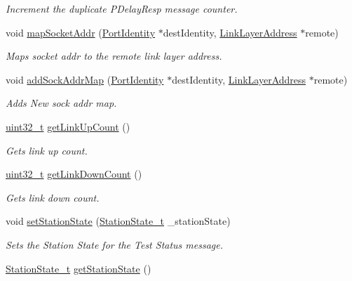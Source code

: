 \begin{DoxyCompactItemize}
\begin{DoxyCompactList}\small\item\em Increment the duplicate P\+Delay\+Resp message counter. \end{DoxyCompactList}\item 
void \hyperlink{class_ether_port_a28bc191b6b7941be6ce7ac75a10f73de}{map\+Socket\+Addr} (\hyperlink{class_port_identity}{Port\+Identity} $\ast$dest\+Identity, \hyperlink{class_link_layer_address}{Link\+Layer\+Address} $\ast$remote)
\begin{DoxyCompactList}\small\item\em Maps socket addr to the remote link layer address. \end{DoxyCompactList}\item 
void \hyperlink{class_ether_port_abcd8e41ae423bd02824183b2e97b73f0}{add\+Sock\+Addr\+Map} (\hyperlink{class_port_identity}{Port\+Identity} $\ast$dest\+Identity, \hyperlink{class_link_layer_address}{Link\+Layer\+Address} $\ast$remote)
\begin{DoxyCompactList}\small\item\em Adds New sock addr map. \end{DoxyCompactList}\item 
\hyperlink{parse_8c_a6eb1e68cc391dd753bc8ce896dbb8315}{uint32\+\_\+t} \hyperlink{class_ether_port_a0a5fca61b7009f358124a07b04d77534}{get\+Link\+Up\+Count} ()
\begin{DoxyCompactList}\small\item\em Gets link up count. \end{DoxyCompactList}\item 
\hyperlink{parse_8c_a6eb1e68cc391dd753bc8ce896dbb8315}{uint32\+\_\+t} \hyperlink{class_ether_port_a2b17baca9933f02f9e3bd25983395d97}{get\+Link\+Down\+Count} ()
\begin{DoxyCompactList}\small\item\em Gets link down count. \end{DoxyCompactList}\item 
void \hyperlink{class_ether_port_ae2e3886b6c2390abad4892141f3114e2}{set\+Station\+State} (\hyperlink{avbap__message_8hpp_a0ea424c21354a92be352893d8feeea22}{Station\+State\+\_\+t} \+\_\+station\+State)
\begin{DoxyCompactList}\small\item\em Sets the Station State for the Test Status message. \end{DoxyCompactList}\item 
\hyperlink{avbap__message_8hpp_a0ea424c21354a92be352893d8feeea22}{Station\+State\+\_\+t} \hyperlink{class_ether_port_ace2ea6ac1044661ce0c3b2fe41c17b67}{get\+Station\+State} ()

\end{DoxyCompactItemize}

